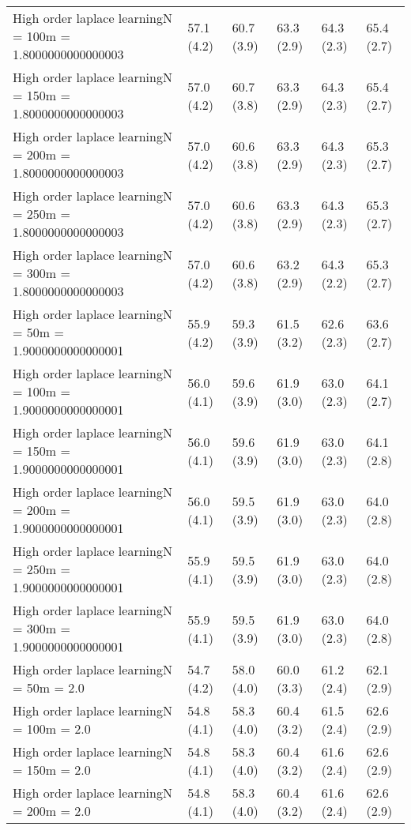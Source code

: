 \documentclass{article}
\begin{document}
\begin{table*}[t!]
\begin{center}
\begin{small}
\begin{sc}
\begin{tabular}{llllll}
High order laplace learningN = 100m = 1.8000000000000003&57.1 (4.2)      &60.7 (3.9)      &63.3 (2.9)      &64.3 (2.3)      &65.4 (2.7)      \\
High order laplace learningN = 150m = 1.8000000000000003&57.0 (4.2)      &60.7 (3.8)      &63.3 (2.9)      &64.3 (2.3)      &65.4 (2.7)      \\
High order laplace learningN = 200m = 1.8000000000000003&57.0 (4.2)      &60.6 (3.8)      &63.3 (2.9)      &64.3 (2.3)      &65.3 (2.7)      \\
High order laplace learningN = 250m = 1.8000000000000003&57.0 (4.2)      &60.6 (3.8)      &63.3 (2.9)      &64.3 (2.3)      &65.3 (2.7)      \\
High order laplace learningN = 300m = 1.8000000000000003&57.0 (4.2)      &60.6 (3.8)      &63.2 (2.9)      &64.3 (2.2)      &65.3 (2.7)      \\
High order laplace learningN = 50m = 1.9000000000000001&55.9 (4.2)      &59.3 (3.9)      &61.5 (3.2)      &62.6 (2.3)      &63.6 (2.7)      \\
High order laplace learningN = 100m = 1.9000000000000001&56.0 (4.1)      &59.6 (3.9)      &61.9 (3.0)      &63.0 (2.3)      &64.1 (2.7)      \\
High order laplace learningN = 150m = 1.9000000000000001&56.0 (4.1)      &59.6 (3.9)      &61.9 (3.0)      &63.0 (2.3)      &64.1 (2.8)      \\
High order laplace learningN = 200m = 1.9000000000000001&56.0 (4.1)      &59.5 (3.9)      &61.9 (3.0)      &63.0 (2.3)      &64.0 (2.8)      \\
High order laplace learningN = 250m = 1.9000000000000001&55.9 (4.1)      &59.5 (3.9)      &61.9 (3.0)      &63.0 (2.3)      &64.0 (2.8)      \\
High order laplace learningN = 300m = 1.9000000000000001&55.9 (4.1)      &59.5 (3.9)      &61.9 (3.0)      &63.0 (2.3)      &64.0 (2.8)      \\
High order laplace learningN = 50m = 2.0&54.7 (4.2)      &58.0 (4.0)      &60.0 (3.3)      &61.2 (2.4)      &62.1 (2.9)      \\
High order laplace learningN = 100m = 2.0&54.8 (4.1)      &58.3 (4.0)      &60.4 (3.2)      &61.5 (2.4)      &62.6 (2.9)      \\
High order laplace learningN = 150m = 2.0&54.8 (4.1)      &58.3 (4.0)      &60.4 (3.2)      &61.6 (2.4)      &62.6 (2.9)      \\
High order laplace learningN = 200m = 2.0&54.8 (4.1)      &58.3 (4.0)      &60.4 (3.2)      &61.6 (2.4)      &62.6 (2.9)      \\

\end{tabular}
\end{sc}
\end{small}
\end{center}
\end{table*}
\end{document}
